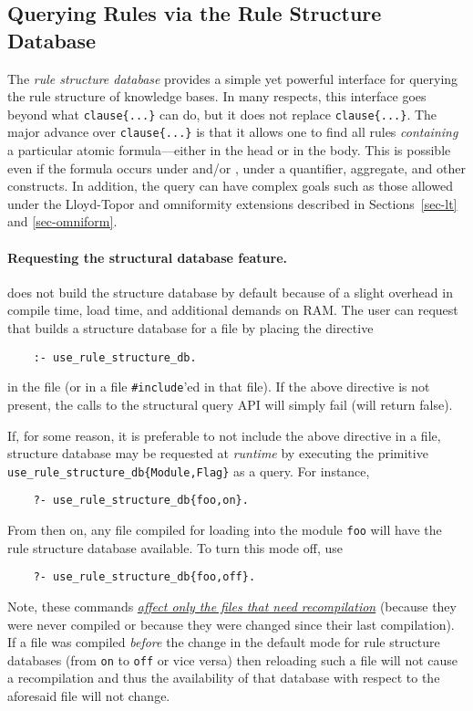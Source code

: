 
\subsection{Querying Rules via the Rule Structure Database}

The \emph{rule structure database} provides a simple yet powerful
interface for querying the rule structure of \ERGO knowledge bases. In many
respects, this interface goes beyond what \texttt{clause\{...\}} can do,
but it does not replace \texttt{clause\{...\}}.
The major advance over \texttt{clause\{...\}} is that it allows one to find
all rules \emph{containing} a particular atomic formula---either in the
head or in the body. This is possible even if the formula occurs under
\texttt{\RULELOGNEG}  and/or \texttt{\RULELOGNAF},  under a quantifier,
aggregate, and other
constructs. In addition, the query can have complex goals such as 
those allowed under the Lloyd-Topor and omniformity extensions described in
Sections~\ref{sec-lt} and \ref{sec-omniform}.


\paragraph{Requesting the structural database feature.}
\ERGO does not build the structure database by default because of a slight
overhead in compile time, load time, and additional demands on RAM.
The user can request that \ERGO builds a structure database for a file by
placing the directive
\begin{verbatim}
    :- use_rule_structure_db.
\end{verbatim}
in the file (or in a file \texttt{\#include}'ed in that file).
If the above directive is not present, the calls to the structural query
API will simply fail (will return false).

If, for some reason, it is preferable to not include
the above directive in a file, structure database may be requested at
\emph{runtime} by executing the primitive
\texttt{use\_rule\_structure\_db\{Module,Flag\}} as a query. For instance,
\begin{verbatim}
    ?- use_rule_structure_db{foo,on}.
\end{verbatim}
From then on, any file compiled for loading into the module \texttt{foo} will
have the rule structure database available. To turn this mode off, use
\begin{verbatim}
    ?- use_rule_structure_db{foo,off}.
\end{verbatim}
Note, these commands \underline{\emph{affect only the files that need
  recompilation}} (because they were never compiled or because they were
changed since their last compilation). If a file was compiled \emph{before}
the change in the default mode for rule structure databases (from
\texttt{on} to \texttt{off} or vice versa) then reloading such a file will
not cause a recompilation and thus the availability of that database with
respect to the aforesaid file will not change.

